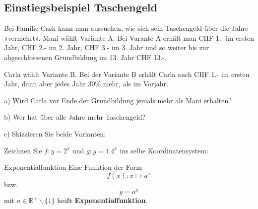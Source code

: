 

\newpage

\subsection{Einstiegsbeispiel Taschengeld}

Bei Familie Cash kann man aussuchen, wie sich sein Taschengeld über
die Jahre «vermehrt». Mani wählt Variante A. Bei Varante A erhält man
CHF 1.- im ersten Jahr, CHF 2.- im 2. Jahr, CHF 3.- im 3. Jahr und so
weiter bis zur abgeschlossenen Grundbildung im 13. Jahr CHF 13.-.

Carla wählt Variante B. Bei der Variante B erhält Carla auch CHF 1.-
im ersten Jahr, dann aber jedes Jahr 30\% mehr, als im Vorjahr.

a) Wird Carla vor Ende der Grundbildung jemals mehr als Mani erhalten?


b) Wer hat über alle Jahre mehr Taschengeld?


c) Skizzieren Sie beide Varianten:





\newpage

Zeichnen Sie $f: y=2^x$ und $g: y=1.4^x$ ins selbe Koordinatensystem:



\begin{definition}{Exponentialfunktion}{}
  Eine Funktion der Form $$f(x): x \mapsto a^x$$
  bzw. $$y = a^x$$
  mit $a\in \mathbb{R}^{+}\backslash\{1\}$ heißt \textbf{Exponentialfunktion}.
\end{definition}


